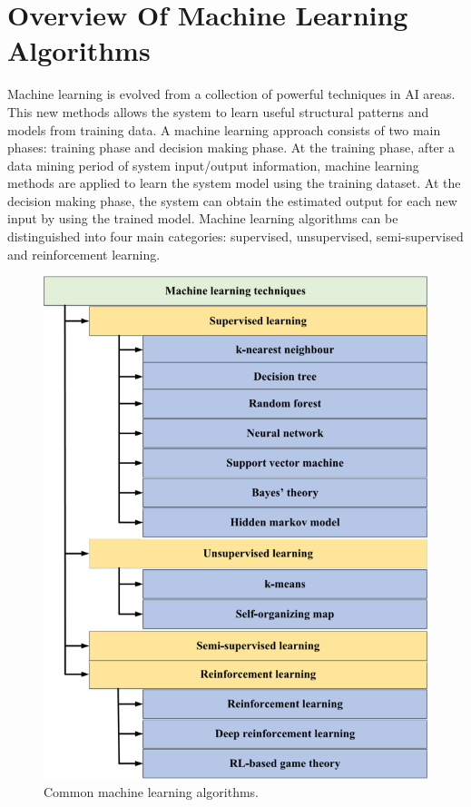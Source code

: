 \section{Overview Of Machine Learning Algorithms} \label{sec:ML_BGK}
Machine learning is evolved from a collection of powerful techniques in AI areas. This new methods allows the system to learn useful structural patterns and models from training data.
A machine learning approach consists of two main phases: training phase and decision making phase. At the training phase, after a data mining period of system input/output information, machine learning methods are applied to learn the system model using the training dataset. At the decision making phase, the system can obtain the estimated output for each new input by using the trained model.
Machine learning algorithms can be distinguished into four main categories: supervised, unsupervised, semi-supervised and reinforcement learning.
\begin{figure}[tb!]
	\centering
	\includegraphics[width=13cm]{figure/ML_algo.png}
	\caption{Common machine learning algorithms.}
	\label{fig:{ML_algo}}
\end{figure}
